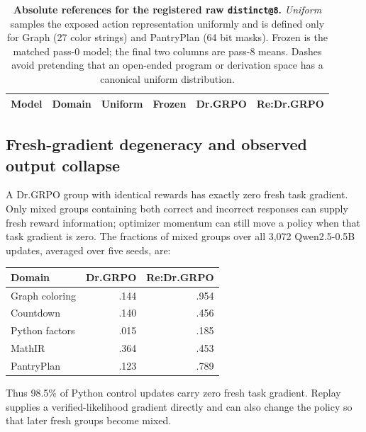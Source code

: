 \documentclass{article}
\makeatletter
\newcommand{\1}{\mathbf 1}
\newcommand{\distk}{\texttt{distinct@8}}
\theoremstyle{remark}
\theoremstyle{definition}
\theoremstyle{plain}
\makeatother
\begin{document}
\begin{table}[t]
  \centering
  \caption{\textbf{Absolute references for the registered raw \distk{}.}
  \emph{Uniform} samples the exposed action representation uniformly and is
  defined only for Graph (27 color strings) and PantryPlan (64 bit masks).
  Frozen is the matched pass-0 model; the final two columns are pass-8 means.
  Dashes avoid pretending that an open-ended program or derivation space has a
  canonical uniform distribution.}
  \label{tab:absolute-support-references}
  \scriptsize
  \setlength{\tabcolsep}{4.2pt}
  \begin{tabular}{@{}llrrrr@{}}
    \toprule
    \textbf{Model} & \textbf{Domain} & \textbf{Uniform} & \textbf{Frozen}
      & \textbf{Dr.GRPO} & \textbf{Re:Dr.GRPO} \\
    \midrule
    
  \end{tabular}
\end{table}


\subsection{Fresh-gradient degeneracy and observed output collapse}
\label{app:degenerate-groups}

A Dr.GRPO group with identical rewards has exactly zero fresh task gradient.
Only mixed groups containing both correct and incorrect responses can
supply fresh reward information; optimizer momentum can still move a
policy when that task gradient is zero. The fractions of mixed groups
over all 3,072 Qwen2.5-0.5B updates, averaged over five seeds, are:

\begin{center}
\small
\begin{tabular}{@{}lrr@{}}
\toprule
\textbf{Domain} & \textbf{Dr.GRPO} & \textbf{Re:Dr.GRPO} \\
\midrule
Graph coloring & .144 & .954 \\
Countdown & .140 & .456 \\
Python factors & .015 & .185 \\
MathIR & .364 & .453 \\
PantryPlan & .123 & .789 \\
\bottomrule
\end{tabular}
\end{center}

Thus 98.5\% of Python control updates carry zero fresh task gradient.
Replay supplies a verified-likelihood gradient directly and can also
change the policy so that later fresh groups become mixed.
\end{document}
